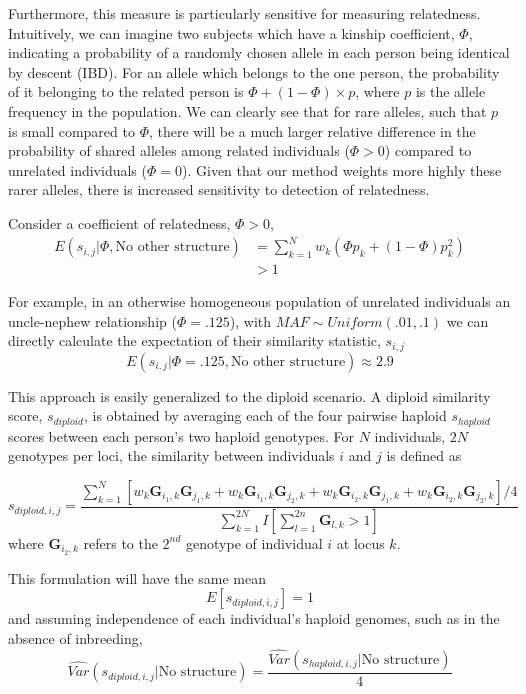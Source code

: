 \documentclass[english]{article}
\begin{document}
Furthermore, this measure is particularly sensitive for measuring
relatedness. Intuitively, we can imagine two subjects which have a
kinship coefficient, $\Phi$, indicating a probability of a randomly
chosen allele in each person being identical by descent (IBD). For
an allele which belongs to the one person, the probability of it belonging
to the related person is $\Phi+\left(1-\Phi\right)\times p$, where
$p$ is the allele frequency in the population. We can clearly see
that for rare alleles, such that $p$ is small compared to $\Phi$,
there will be a much larger relative difference in the probability
of shared alleles among related individuals ($\Phi>0$) compared to
unrelated individuals ($\Phi=0$). Given that our method weights more
highly these rarer alleles, there is increased sensitivity to detection
of relatedness.

Consider a coefficient of relatedness, $\Phi>0$,
\begin{align*}
E\left(s_{i,j}|\Phi,\mbox{No other structure}\right) & =\sum_{k=1}^{N}w_{k}\left(\Phi p_{k}+\left(1-\Phi\right)p_{k}^{2}\right)\\
 & >1
\end{align*}


For example, in an otherwise homogeneous population of unrelated individuals
an uncle-nephew relationship ($\Phi=.125$), with $MAF\sim Uniform\left(.01,.1\right)$
we can directly calculate the expectation of their similarity statistic,
$s_{i,j}$ 
\[
E\left(s_{i,j}|\Phi=.125,\mbox{No other structure}\right)\approx2.9
\]


This approach is easily generalized to the diploid scenario. A diploid
similarity score, $s_{diploid}$, is obtained by averaging each of
the four pairwise haploid $s_{haploid}$ scores between each person's
two haploid genotypes. For $N$ individuals, $2N$ genotypes per loci,
the similarity between individuals $i$ and $j$ is defined as

\[
s_{diploid,i,j}=\frac{\sum_{k=1}^{N}\left[w_{k}\mathbf{G}_{i_{1},k}\mathbf{G}_{j_{1},k}+w_{k}\mathbf{G}_{i_{1},k}\mathbf{G}_{j_{2},k}+w_{k}\mathbf{G}_{i_{2},k}\mathbf{G}_{j_{1},k}+w_{k}\mathbf{G}_{i_{2},k}\mathbf{G}_{j_{2},k}\right]/4}{\sum_{k=1}^{2N}I\left[\sum_{l=1}^{2n}\mathbf{G}_{l,k}>1\right]}
\]
where $\mathbf{G}_{i_{2},k}$ refers to the $2^{nd}$ genotype of
individual $i$ at locus $k$.

This formulation will have the same mean
\[
E\left[s_{diploid,i,j}\right]=1
\]
and assuming independence of each individual's haploid genomes, such
as in the absence of inbreeding,
\[
\hat{Var}\left(s_{diploid,i,j}|\mbox{No structure}\right)=\frac{\hat{Var}\left(s_{haploid,i,j}|\mbox{No structure}\right)}{4}
\]
 
\end{document}
